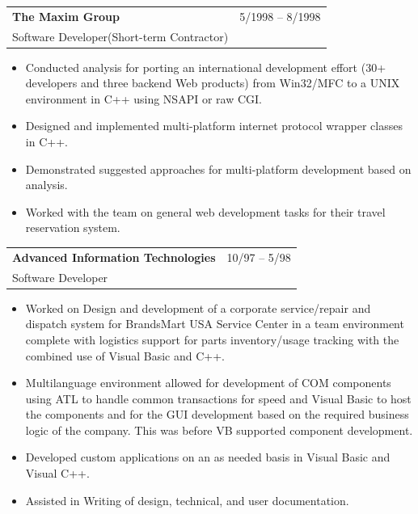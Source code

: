 \documentclass[10pt]{report}
\begin{document}
\noindent
\begin{tabular}{ L{.5\textwidth}  R{.4\textwidth} }
\textbf{\large The Maxim Group}  & 5/1998 -- 8/1998 \\
Software Developer(Short-term Contractor) &
\end{tabular}

\begin{itemize}
\item Conducted analysis for porting an international development effort (30+ developers and three backend Web products) from Win32/MFC to a UNIX environment in C++ using NSAPI or raw CGI.
\item Designed and implemented multi-platform internet protocol wrapper classes in C++.
\item Demonstrated suggested approaches for multi-platform development based on analysis.
\item Worked with the team on general web development tasks for their travel reservation system.
\end{itemize}
\bigskip


\noindent
\begin{tabular}{ L{.5\textwidth}  R{.4\textwidth} }
\textbf{\large Advanced Information Technologies}  & 10/97 -- 5/98 \\
Software Developer &
\end{tabular}

\begin{itemize}
\item Worked on Design and development of a corporate service/repair and dispatch system for BrandsMart USA Service Center in a team environment complete with logistics support for parts inventory/usage tracking with the combined use of Visual Basic and C++.
\item Multilanguage environment allowed for development of COM components using ATL to handle common transactions for speed and Visual Basic to host the components and for the GUI development based on the required business logic of the company.  This was before VB supported component development.
\item Developed custom applications on an as needed basis in Visual Basic and Visual C++.
\item Assisted in Writing of design, technical, and user documentation.
\end{itemize}
\bigskip
\end{document}
